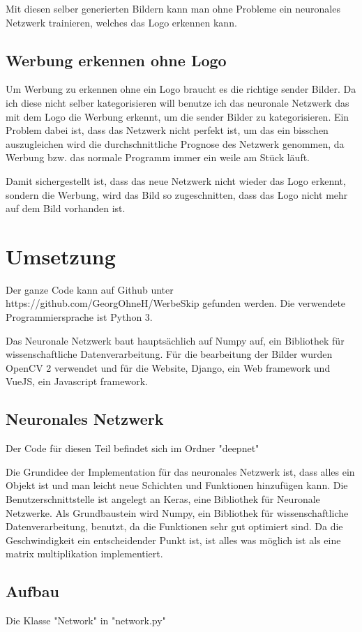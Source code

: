 \documentclass[12pt,a4paper]{report}
\begin{document}
Mit diesen selber generierten Bildern kann man ohne Probleme ein neuronales Netzwerk trainieren, welches das Logo erkennen kann.
\section{Werbung erkennen ohne Logo}
Um Werbung zu erkennen ohne ein Logo braucht es die richtige sender Bilder.
Da ich diese nicht selber kategorisieren will benutze ich das neuronale Netzwerk das mit dem Logo die Werbung erkennt, um die sender Bilder zu kategorisieren.
Ein Problem dabei ist, dass das Netzwerk nicht perfekt ist, um das ein bisschen auszugleichen wird die durchschnittliche Prognose des Netzwerk genommen,
da Werbung bzw. das normale Programm immer ein weile am Stück läuft.

Damit sichergestellt ist, dass das neue Netzwerk nicht wieder das Logo erkennt, sondern die Werbung,
wird das Bild so zugeschnitten, dass das Logo nicht mehr auf dem Bild vorhanden ist.




\chapter{Umsetzung}
\label{ch:umsetzung}
Der ganze Code kann auf Github unter https://github.com/GeorgOhneH/WerbeSkip gefunden werden.
Die verwendete Programmiersprache ist Python 3.

Das Neuronale Netzwerk baut hauptsächlich auf Numpy auf, ein Bibliothek für wissenschaftliche Datenverarbeitung.
Für die bearbeitung der Bilder wurden OpenCV 2 verwendet und für die Website, Django, ein Web framework und VueJS, ein Javascript framework.
\section{Neuronales Netzwerk}
Der Code für diesen Teil befindet sich im Ordner "deepnet"

Die Grundidee der Implementation für das neuronales Netzwerk ist, dass alles ein Objekt ist und man leicht neue Schichten und Funktionen hinzufügen kann.
Die Benutzerschnittstelle ist angelegt an Keras, eine Bibliothek für Neuronale Netzwerke.
Als Grundbaustein wird Numpy, ein Bibliothek für wissenschaftliche Datenverarbeitung, benutzt,
da die Funktionen sehr gut optimiert sind.
Da die Geschwindigkeit ein entscheidender Punkt ist, ist alles was möglich ist als eine matrix multiplikation implementiert.

\section{Aufbau}
Die Klasse "Network" in "network.py"
\end{document}
